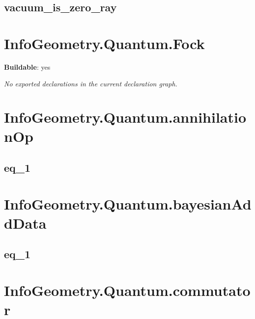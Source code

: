 \subsection*{vacuum_is_zero_ray}

\begin{theorem}[blueprint="infogeometry:quantum:vacuum_is_zero_ray"]
\end{theorem}

\section{InfoGeometry.Quantum.Fock}

\noindent\textbf{Buildable}: yes

\noindent\emph{No exported declarations in the current declaration graph.}

\section{InfoGeometry.Quantum.annihilationOp}

\subsection*{eq_1}

\begin{theorem}[blueprint="infogeometry:quantum:annihilationop:eq_1"]
\end{theorem}

\section{InfoGeometry.Quantum.bayesianAddData}

\subsection*{eq_1}

\begin{theorem}[blueprint="infogeometry:quantum:bayesianadddata:eq_1"]
\end{theorem}

\section{InfoGeometry.Quantum.commutator}

